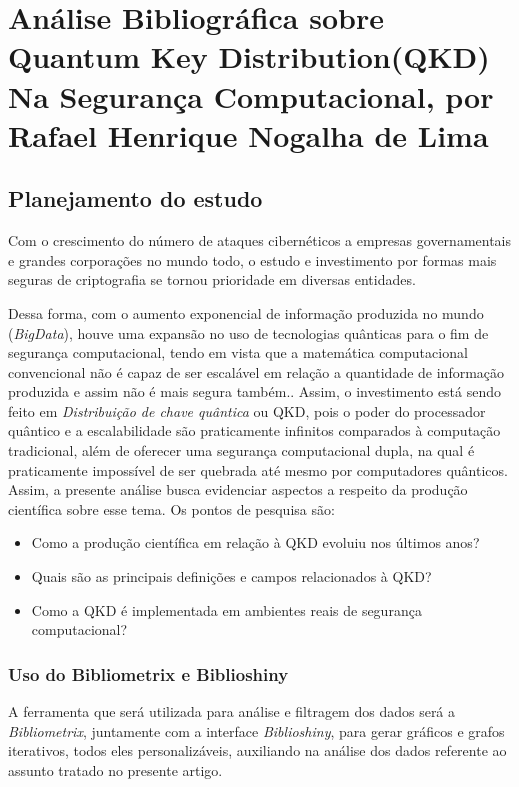 \chapter{Análise Bibliográfica sobre Quantum Key Distribution(QKD) Na Segurança Computacional, por Rafael Henrique Nogalha de Lima}

\section{Planejamento do estudo}

Com o crescimento do número de ataques cibernéticos a empresas governamentais e grandes corporações no mundo todo, o estudo e investimento por formas mais seguras de criptografia se tornou prioridade em diversas entidades. 

Dessa forma, com o aumento exponencial de informação produzida no mundo (\textit{BigData}), houve uma expansão no uso de tecnologias quânticas para o fim de segurança computacional, tendo em vista que a matemática computacional convencional não é capaz de ser escalável em relação a quantidade de informação produzida e assim não é mais segura também.. Assim, o investimento está sendo feito em \textit{Distribuição de chave quântica} ou QKD, pois o poder do processador quântico e a escalabilidade são praticamente infinitos comparados à computação tradicional, além de oferecer uma segurança computacional dupla, na qual é praticamente impossível de ser quebrada até mesmo por computadores quânticos. Assim, a presente análise busca evidenciar aspectos a respeito da produção científica sobre esse tema. Os pontos de pesquisa são:

\begin{itemize}
    \item Como a produção científica em relação à QKD evoluiu nos últimos anos?
    \item Quais são as principais definições e campos relacionados à QKD?
    \item Como a QKD é implementada em ambientes reais de segurança computacional?
\end{itemize}

\subsection{Uso do Bibliometrix e Biblioshiny}

A ferramenta que será utilizada para análise e filtragem dos dados será a \textit{Bibliometrix}, juntamente com a interface \textit{Biblioshiny}, para gerar gráficos e grafos iterativos, todos eles personalizáveis, auxiliando na análise dos dados referente ao assunto tratado no presente artigo.

